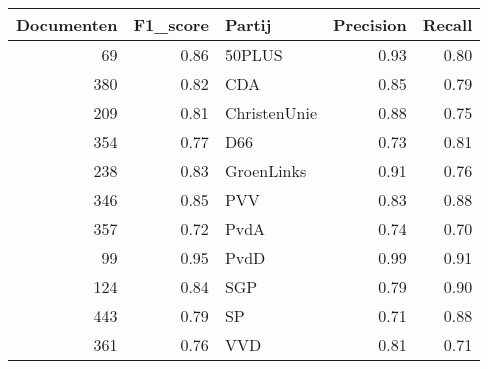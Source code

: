 \begin{tabular}{rrlrr}
\toprule
 Documenten &  F1\_score &        Partij &  Precision &  Recall \\
\midrule
         69 &      0.86 &        50PLUS &       0.93 &    0.80 \\
        380 &      0.82 &           CDA &       0.85 &    0.79 \\
        209 &      0.81 &  ChristenUnie &       0.88 &    0.75 \\
        354 &      0.77 &           D66 &       0.73 &    0.81 \\
        238 &      0.83 &    GroenLinks &       0.91 &    0.76 \\
        346 &      0.85 &           PVV &       0.83 &    0.88 \\
        357 &      0.72 &          PvdA &       0.74 &    0.70 \\
         99 &      0.95 &          PvdD &       0.99 &    0.91 \\
        124 &      0.84 &           SGP &       0.79 &    0.90 \\
        443 &      0.79 &            SP &       0.71 &    0.88 \\
        361 &      0.76 &           VVD &       0.81 &    0.71 \\
\bottomrule
\end{tabular}
